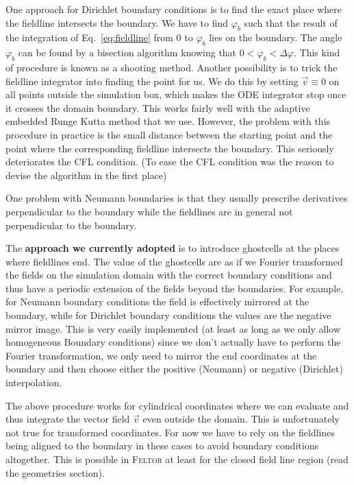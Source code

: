 One approach for Dirichlet boundary conditions
is to find the exact place where the fieldline intersects the boundary.
We have to find
$\varphi_b$ such that the result of the integration of Eq.~\eqref{eq:fieldline} from
$0$ to $\varphi_b$ lies on the boundary.
The angle $\varphi_b$ can be found by a bisection algorithm knowing that $0<\varphi_b < \Delta\varphi$.
This kind of procedure is known as a shooting method.
Another possibility is to trick the fieldline integrator into finding the point for us.
We do this by setting $\vec v \equiv 0$ on all points outside the simulation box, which
makes the ODE integrator stop once it crosses the domain boundary.
This works fairly well with the adaptive embedded Runge Kutta method that we use.
However, the problem with this procedure in practice is the small
distance between the starting point and the point where the corresponding
fieldline intersects the boundary. This seriously deteriorates the
CFL condition. (To ease the CFL condition
was the reason to devise the algorithm in the first place)

One problem with Neumann boundaries is that they usually prescribe
derivatives perpendicular to the boundary
while the fieldlines are in general not perpendicular to the boundary.

The \textbf{approach we currently adopted} is to introduce ghostcells at the
places where fieldlines end. The value of the ghostcells are
as if we Fourier transformed the fields on the simulation domain
with the correct boundary conditions and thus have a periodic
extension of the fields beyond the boundaries.
For example, for Neumann boundary
conditions the field is effectively mirrored at the boundary, while for
Dirichlet boundary conditions the values are the negative mirror image.
This is very easily implemented (at least as long as we only allow
homogeneous Boundary conditions) since we don't actually have to
perform the Fourier transformation, we only need to mirror the end
coordinates at the boundary and then choose either the positive (Neumann) or
negative (Dirichlet) interpolation.

The above procedure works for cylindrical coordinates where we can
evaluate and thus integrate the vector field $\vec v$ even outside the domain.
This is unfortunately not true for transformed coordinates.
For now we have to rely on the fieldlines being aligned to the
boundary in these cases to avoid boundary conditions altogether.
This is possible in \textsc{Feltor} at least for the closed field line region
(read the geometries section).


